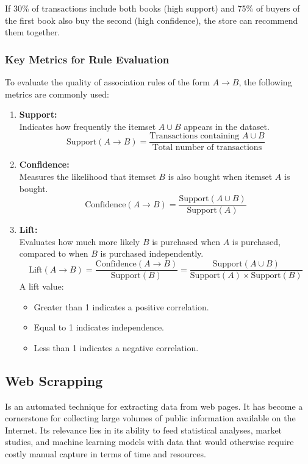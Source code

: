 \documentclass[runningheads]{llncs}
\begin{document}
If 30\% of transactions include both books (high support) and 75\% of buyers of the first book also buy the second (high confidence), the store can recommend them together.
\subsubsection{Key Metrics for Rule Evaluation}

To evaluate the quality of association rules of the form \( A \rightarrow B \), the following metrics are commonly used:

\begin{enumerate}
	\item \textbf{Support:} \\
	Indicates how frequently the itemset \( A \cup B \) appears in the dataset.
	\[
	\text{Support}(A \rightarrow B) = \frac{\text{Transactions containing } A \cup B}{\text{Total number of transactions}}
	\]
	
	\item \textbf{Confidence:} \\
	Measures the likelihood that itemset \( B \) is also bought when itemset \( A \) is bought.
	\[
	\text{Confidence}(A \rightarrow B) = \frac{\text{Support}(A \cup B)}{\text{Support}(A)}
	\]
	
	\item \textbf{Lift:} \\
	Evaluates how much more likely \( B \) is purchased when \( A \) is purchased, compared to when \( B \) is purchased independently.
	\[
	\text{Lift}(A \rightarrow B) = \frac{\text{Confidence}(A \rightarrow B)}{\text{Support}(B)} = \frac{\text{Support}(A \cup B)}{\text{Support}(A) \times \text{Support}(B)}
	\]
	A lift value:
	\begin{itemize}
		\item Greater than 1 indicates a positive correlation.
		\item Equal to 1 indicates independence.
		\item Less than 1 indicates a negative correlation.
	\end{itemize}
\end{enumerate}

\subsection{Web Scrapping}

Is an automated technique for extracting data from web pages. It has become a cornerstone for collecting large volumes of public information available on the Internet. Its relevance lies in its ability to feed statistical analyses, market studies, and machine learning models with data that would otherwise require costly manual capture in terms of time and resources. \cite{gfg_web_scraping}
\end{document}
